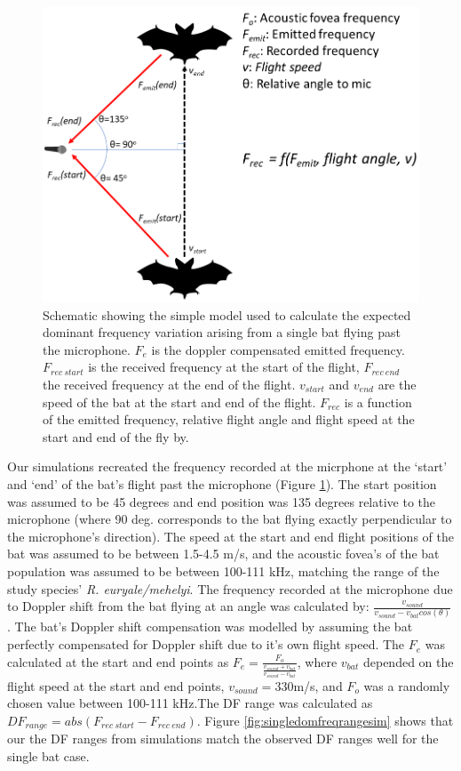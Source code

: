 \documentclass[
]{book}
\begin{document}
\begin{figure}
\includegraphics[width=1\linewidth]{original_papers/hbc-paper/figures/doppler_shift_schematic} \caption{Schematic showing the simple model used to calculate the expected dominant frequency variation arising from a single bat flying past the microphone. $F_{e}$ is the doppler compensated emitted frequency. $F_{rec \:start}$ is the received frequency at the start of the flight, $F_{rec \:end}$ the received frequency at the end of the flight. $v_{start}$ and $v_{end}$ are the speed of the bat at the start and end of the flight. $F_{rec}$ is a function of the emitted frequency, relative flight angle and flight speed at the start and end of the fly by.}\label{fig:dopplerschematic}
\end{figure}

Our simulations recreated the frequency recorded at the micrphone at the `start' and `end' of the bat's flight past the microphone (Figure \ref{fig:dopplerschematic}). The start position was assumed to be 45 degrees and end position was 135 degrees relative to the microphone (where 90 deg. corresponds to the bat flying exactly perpendicular to the microphone's direction). The speed at the start and end flight positions of the bat was assumed to be between 1.5-4.5 m/s, and the acoustic fovea's of the bat population was assumed to be between 100-111 kHz, matching the range of the study species' \emph{R. euryale/mehelyi}. The frequency recorded at the microphone due to Doppler shift from the bat flying at an angle was calculated by: \(\frac{v_{sound}}{v_{sound}-v_{bat}cos(\theta)}\). The bat's Doppler shift compensation was modelled by assuming the bat perfectly compensated for Doppler shift due to it's own flight speed. The \(F_{e}\) was calculated at the start and end points as \(F_{e}=\frac{F_{o}}{\frac{v_{sound}+v_{bat}}{v_{sound}-v_{bat}}}\), where \(v_{bat}\) depended on the flight speed at the start and end points, \(v_{sound}=330\)m/s, and \(F_{o}\) was a randomly chosen value between 100-111 kHz.The DF range was calculated as \(DF_{range}=abs(F_{rec\:start}-F_{rec\:end})\). Figure \ref{fig:singledomfreqrangesim} shows that our the DF ranges from simulations match the observed DF ranges well for the single bat case.
\end{document}
